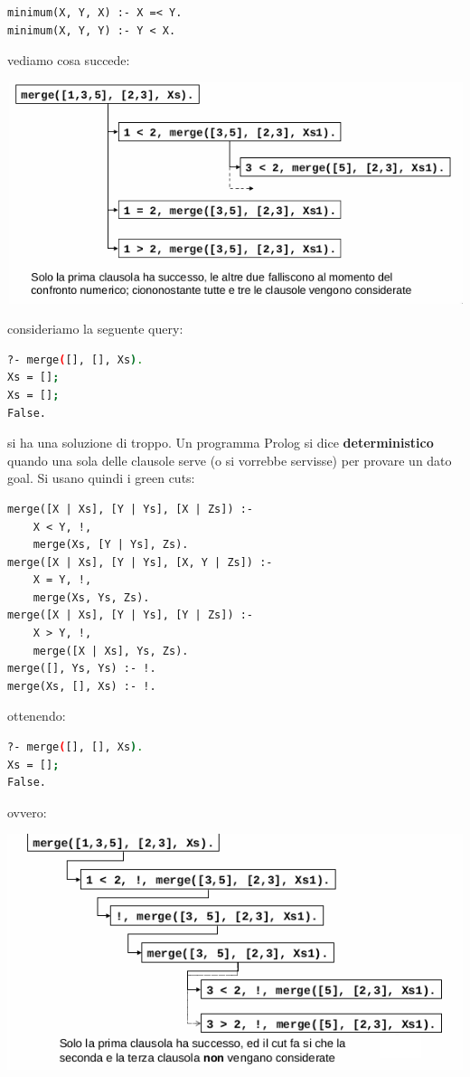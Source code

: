 \documentclass[a4paper]{report}
\begin{document}
\begin{itemize}
\begin{verbatim}
minimum(X, Y, X) :- X =< Y.
minimum(X, Y, Y) :- Y < X.
\end{verbatim}
vediamo cosa succede:
\begin{center}
\includegraphics[scale=0.8]{img/cut2.png}
\end{center}
consideriamo la seguente query:
\begin{shaded}
\begin{lstlisting}[language=bash]
?- merge([], [], Xs).
Xs = [];
Xs = [];
False.
\end{lstlisting}
\end{shaded}
si ha una soluzione di troppo.
Un programma Prolog si dice \textbf{deterministico} quando una sola delle clausole serve (o si vorrebbe servisse) per provare un dato goal. Si usano quindi i green cuts:
\begin{verbatim}
merge([X | Xs], [Y | Ys], [X | Zs]) :-
	X < Y, !,
	merge(Xs, [Y | Ys], Zs).
merge([X | Xs], [Y | Ys], [X, Y | Zs]) :-
	X = Y, !,
	merge(Xs, Ys, Zs).
merge([X | Xs], [Y | Ys], [Y | Zs]) :-
	X > Y, !,
	merge([X | Xs], Ys, Zs).
merge([], Ys, Ys) :- !.
merge(Xs, [], Xs) :- !.
\end{verbatim}
ottenendo:
\begin{shaded}
\begin{lstlisting}[language=bash]
?- merge([], [], Xs).
Xs = [];
False.
\end{lstlisting}
\end{shaded}
ovvero:
\begin{center}
\includegraphics[scale=0.8]{img/cut3.png}

\end{center}
\end{itemize}
\end{document}
